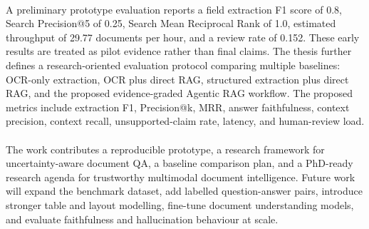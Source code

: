 \paragraph{} A preliminary prototype evaluation reports a field extraction F1 score of 0.8, Search Precision@5 of 0.25, Search Mean Reciprocal Rank of 1.0, estimated throughput of 29.77 documents per hour, and a review rate of 0.152. These early results are treated as pilot evidence rather than final claims. The thesis further defines a research-oriented evaluation protocol comparing multiple baselines: OCR-only extraction, OCR plus direct RAG, structured extraction plus direct RAG, and the proposed evidence-graded Agentic RAG workflow. The proposed metrics include extraction F1, Precision@k, MRR, answer faithfulness, context precision, context recall, unsupported-claim rate, latency, and human-review load.

\paragraph{} The work contributes a reproducible prototype, a research framework for uncertainty-aware document QA, a baseline comparison plan, and a PhD-ready research agenda for trustworthy multimodal document intelligence. Future work will expand the benchmark dataset, add labelled question-answer pairs, introduce stronger table and layout modelling, fine-tune document understanding models, and evaluate faithfulness and hallucination behaviour at scale.
